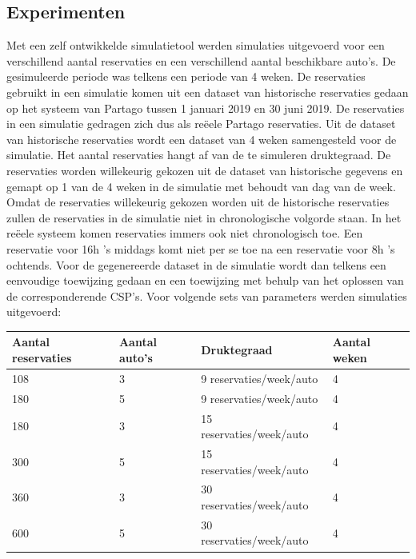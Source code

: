 \documentclass[a0,portrait]{a0poster}
\begin{document}
\begin{multicols}{2}
\color{Black} %
\color{HoGentAccent1} 
\section*{Experimenten}
\color{black}
Met een zelf ontwikkelde simulatietool werden simulaties uitgevoerd voor een verschillend aantal reservaties en een verschillend aantal beschikbare auto's. De gesimuleerde periode was telkens een periode van 4 weken. De reservaties gebruikt in een simulatie komen uit een dataset van historische reservaties gedaan op het systeem van Partago tussen 1 januari 2019 en 30 juni 2019. De reservaties in een simulatie gedragen zich dus als reëele Partago reservaties. Uit de dataset van historische reservaties wordt een dataset van 4 weken samengesteld voor de simulatie. Het aantal reservaties hangt af van de te simuleren druktegraad. De reservaties worden willekeurig gekozen uit de dataset van historische gegevens en gemapt op 1 van de 4 weken in de simulatie met behoudt van dag van de week. Omdat de reservaties willekeurig gekozen worden uit de historische reservaties zullen de reservaties in de simulatie niet in chronologische volgorde staan. In het reëele systeem komen reservaties immers ook niet chronologisch toe. Een reservatie voor 16h 's middags komt niet per se toe na een reservatie voor 8h 's ochtends. Voor de gegenereerde dataset in de simulatie wordt dan telkens een eenvoudige toewijzing gedaan en een toewijzing met behulp van het oplossen van de corresponderende CSP's. Voor volgende sets van parameters werden simulaties uitgevoerd: 
\begin{center}
	\label{tab:parameters}
	\begin{tabular}{ | l | l | l | p{3cm} |}
		\hline
		Aantal reservaties & Aantal auto's & Druktegraad & Aantal weken \\ \hline
		108 & 3 & 9 reservaties/week/auto & 4 \\ \hline
		180 & 5 & 9 reservaties/week/auto & 4 \\ \hline
		180 & 3 & 15 reservaties/week/auto & 4 \\ \hline
		300 & 5 & 15 reservaties/week/auto & 4 \\ \hline
		360 & 3 & 30 reservaties/week/auto & 4 \\ \hline
		600 & 5 & 30 reservaties/week/auto & 4 \\ \hline
	\end{tabular}
\end{center} 


\end{multicols}
\end{document}
